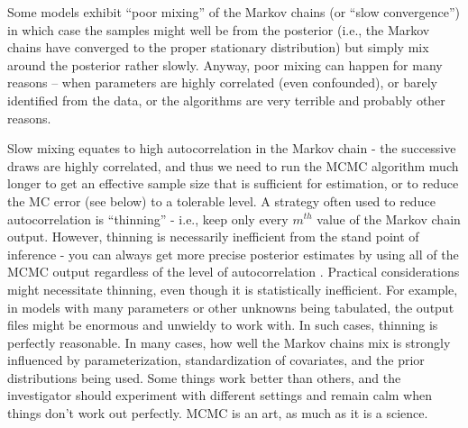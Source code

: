 Some models exhibit ``poor mixing'' of the Markov chains (or ``slow convergence'')
in which case the samples might well
be from the posterior (i.e., the Markov chains have converged to the
proper stationary distribution) but simply mix around the posterior
rather slowly. Anyway, poor mixing can happen for many
reasons -- when parameters are highly correlated (even confounded), or
barely identified from the data, or the algorithms are very terrible
and probably other reasons.  

Slow mixing equates to high
autocorrelation in the Markov chain - the successive draws are highly
correlated, and thus we need to run the MCMC algorithm much longer to
get an effective sample size that is sufficient for estimation, or to
reduce the MC error (see below) to a tolerable level.  A strategy often used to
reduce autocorrelation is ``thinning'' - i.e., keep only every $m^{th}$
value of the Markov chain output. However, thinning is necessarily
inefficient from the stand point of inference - you can always get
more precise posterior estimates by using all of the MCMC output
regardless of the level of autocorrelation
\citep{maceachern_berliner:1994, link_eaton:2011}. Practical considerations might
necessitate thinning, even though it is statistically inefficient. For
example, in models with many parameters or other unknowns being
tabulated, the output files might be enormous and unwieldy to work
with. In such cases, thinning is perfectly reasonable. In many cases,
how well the Markov chains mix is strongly influenced by
parameterization, standardization of covariates, and the prior
distributions being used. Some things work better than others, and the
investigator should experiment with different settings and
remain calm when things don't work out perfectly. MCMC is an
art, as much as it is a science.


